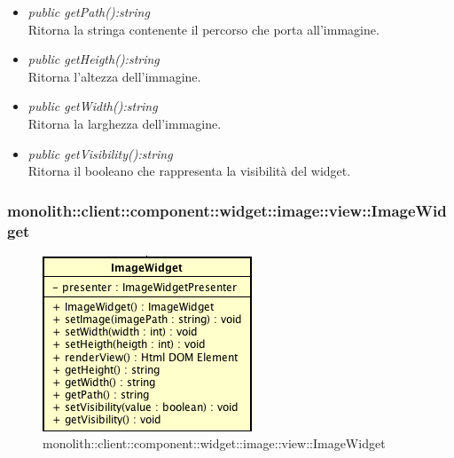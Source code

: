 \begin{itemize}
\begin{itemize}
\begin{itemize}
		\end{itemize} 
	\item \textit{public getPath():string}\\
	Ritorna la stringa contenente il percorso che porta all'immagine.
	\item \textit{public getHeigth():string}\\
	Ritorna l'altezza dell'immagine.
	\item \textit{public getWidth():string}\\
	Ritorna la larghezza dell'immagine.
	\item \textit{public getVisibility():string}\\
	Ritorna il booleano che rappresenta la visibilità del widget.
	\end{itemize}
\end{itemize}

\subsubsection{monolith::client::component::widget::image::view::ImageWidget}

\label{monolith::client::component::widget::image::view::ImageWidget}
\begin{figure}[H]
	\centering
	\includegraphics[scale=0.5]{Sezioni/SottosezioniST/img/ImageWidget.png}
	\caption{monolith::client::component::widget::image::view::ImageWidget}
\end{figure}

